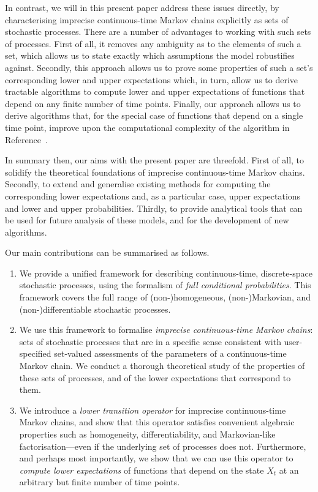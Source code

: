 \documentclass[10pt,a4paper]{paper}
\theoremstyle{definition}
\begin{document}
In contrast, we will in this present paper address these issues directly, by characterising imprecise continuous-time Markov chains explicitly as sets of stochastic processes. There are a number of advantages to working with such sets of processes. First of all, it removes any ambiguity as to the elements of such a set, which allows us to state exactly which assumptions the model robustifies against. Secondly, this approach allows us to prove some properties of such a set's corresponding lower and upper expectations which, in turn, allow us to derive tractable algorithms to compute lower and upper expectations of functions that depend on any finite number of time points. Finally, our approach allows us to derive algorithms that, for the special case of functions that depend on a single time point, improve upon the computational complexity of the algorithm in Reference~\cite{Skulj:2015cq}.

In summary then, our aims with the present paper are threefold. First of all, to solidify the theoretical foundations of imprecise continuous-time Markov chains. Secondly, to extend and generalise existing methods for computing the corresponding lower expectations and, as a particular case, upper expectations and lower and upper probabilities. Thirdly, to provide analytical tools that can be used for future analysis of these models, and for the development of new algorithms.

Our main contributions can be summarised as follows.
\begin{enumerate}
\item We provide a unified framework for describing continuous-time, discrete-space stochastic processes, using the formalism of \emph{full conditional probabilities}. This framework covers the full range of (non-)homogeneous, (non-)Markovian, and (non-)differentiable stochastic processes.
\item We use this framework to formalise \emph{imprecise continuous-time Markov chains}: sets of stochastic processes that are in a specific sense consistent with user-specified set-valued assessments of the parameters of a continuous-time Markov chain. We conduct a thorough theoretical study of the properties of these sets of processes, and of the lower expectations that correspond to them. 
\item We introduce a \emph{lower transition operator} for imprecise continuous-time Markov chains, and show that this operator satisfies convenient algebraic properties such as homogeneity, differentiability, and Markovian-like factorisation---even if the underlying set of processes does not. Furthermore, and perhaps most importantly, we show that we can use this operator to \emph{compute lower expectations} of functions that depend on the state $X_t$ at an arbitrary but finite number of time points.
\end{enumerate}
\end{document}
